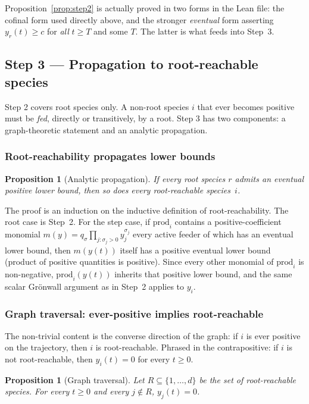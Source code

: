 \documentclass[11pt]{article}
\newtheorem{proposition}[theorem]{Proposition}
\newcommand{\prodpoly}{\mathrm{prod}}
\begin{document}
Proposition~\ref{prop:step2} is actually proved in two forms in the Lean
file: the cofinal form used directly above, and the stronger
\emph{eventual} form asserting $y_r(t) \ge c$ for \emph{all} $t \ge T$ and
some $T$. The latter is what feeds into Step~3.

\subsection{Step 3 --- Propagation to root-reachable species}

Step 2 covers root species only. A non-root species $i$ that ever becomes
positive must be \emph{fed}, directly or transitively, by a root. Step 3 has
two components: a graph-theoretic statement and an analytic propagation.

\subsubsection{Root-reachability propagates lower bounds}

\begin{proposition}[Analytic propagation]\label{prop:analytic-prop}
If every root species $r$ admits an eventual positive lower bound, then so
does every root-reachable species~$i$.
\end{proposition}

The proof is an induction on the inductive definition of root-reachability.
The root case is Step~2. For the step case, if $\prodpoly_i$ contains a
positive-coefficient monomial
$m(y) = q_\sigma \prod_{j : \sigma_j > 0} y_j^{\sigma_j}$ every active feeder
of which has an eventual lower bound, then $m(y(t))$ itself has a positive
eventual lower bound (product of positive quantities is positive). Since
every other monomial of $\prodpoly_i$ is non-negative, $\prodpoly_i(y(t))$
inherits that positive lower bound, and the same scalar Gr\"onwall argument
as in Step~2 applies to $y_i$.

\subsubsection{Graph traversal: ever-positive implies root-reachable}

The non-trivial content is the converse direction of the graph: if $i$ is
ever positive on the trajectory, then $i$ is root-reachable. Phrased in the
contrapositive: if $i$ is not root-reachable, then $y_i(t) = 0$ for every
$t \ge 0$.

\begin{proposition}[Graph traversal]\label{prop:graph-trav}
Let $R \subseteq \{1, \ldots, d\}$ be the set of root-reachable species. For
every $t \ge 0$ and every $j \notin R$, $y_j(t) = 0$.
\end{proposition}
\end{document}
